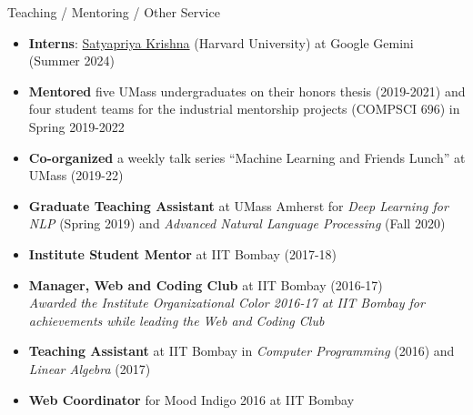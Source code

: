 \documentclass{resume} %
\begin{document}
\begin{rSection}{Teaching / Mentoring / Other Service}
\vspace*{0.1in}
\begin{itemize}[leftmargin=*]
\item \textbf{Interns}: \href{https://satyapriyakrishna.com}{Satyapriya Krishna} (Harvard University) at Google Gemini (Summer 2024)
\item \textbf{Mentored} five UMass undergraduates on their honors thesis (2019-2021) and four student teams for the industrial mentorship projects (COMPSCI 696) in Spring 2019-2022
\item \textbf{Co-organized} a weekly talk series ``Machine Learning and Friends Lunch'' at UMass (2019-22)
\item \textbf{Graduate Teaching Assistant} at UMass Amherst for \textit{Deep Learning for NLP} (Spring 2019) and \textit{Advanced Natural Language Processing} (Fall 2020)
\item \textbf{Institute Student Mentor} at IIT Bombay (2017-18)
\item \textbf{Manager, Web and Coding Club} at IIT Bombay (2016-17)\\
\textit{Awarded the Institute Organizational Color 2016-17 at IIT Bombay for achievements while leading the Web and Coding Club}
\item \textbf{Teaching Assistant} at IIT Bombay in \textit{Computer Programming} (2016) and \textit{Linear Algebra} (2017)
\item \textbf{Web Coordinator} for Mood Indigo 2016 at IIT Bombay
\end{itemize}
\end{rSection}

\vspace{0.1in}
\end{document}
